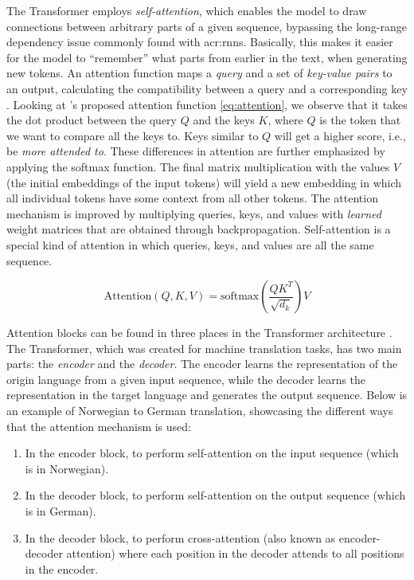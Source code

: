 The Transformer employs \textit{self-attention}, which enables the model to draw connections between arbitrary parts of a given sequence, bypassing the long-range dependency issue commonly found with \glspl{acr:rnn}. Basically, this makes it easier for the model to \enquote{remember} what parts from earlier in the text, when generating new tokens. An attention function maps a \textit{query} and a set of \textit{key-value pairs} to an output, calculating the compatibility between a query and a corresponding key \citep[3]{vaswaniAttentionAllYou2017}. Looking at \citeauthor{vaswaniAttentionAllYou2017}'s proposed attention function \eqref{eq:attention}, we observe that it takes the dot product between the query $Q$ and the keys $K$, where $Q$ is the token that we want to compare all the keys to. Keys similar to $Q$ will get a higher score, i.e., be \textit{more attended to}. These differences in attention are further emphasized by applying the softmax function. The final matrix multiplication with the values $V$ (the initial embeddings of the input tokens) will yield a new embedding in which all individual tokens have some context from all other tokens. The attention mechanism is improved by multiplying queries, keys, and values with \textit{learned} weight matrices that are obtained through backpropagation. Self-attention is a special kind of attention in which queries, keys, and values are all the same sequence.

\begin{equation}
    \text{Attention}(Q, K, V) = \text{softmax}\left(\frac{QK^T}{\sqrt{d_k}}\right)V
    \label{eq:attention}
\end{equation}

Attention blocks can be found in three places in the Transformer architecture \citep[5]{vaswaniAttentionAllYou2017}. The Transformer, which was created for machine translation tasks, has two main parts: the \textit{encoder} and the \textit{decoder}. The encoder learns the representation of the origin language from a given input sequence, while the decoder learns the representation in the target language and generates the output sequence. Below is an example of Norwegian to German translation, showcasing the different ways that the attention mechanism is used:

\begin{enumerate}
    \item In the encoder block, to perform self-attention on the input sequence (which is in Norwegian).
    \item In the decoder block, to perform self-attention on the output sequence (which is in German).
    \item In the decoder block, to perform cross-attention (also known as encoder-decoder attention) where each position in the decoder attends to all positions in the encoder.
\end{enumerate}

